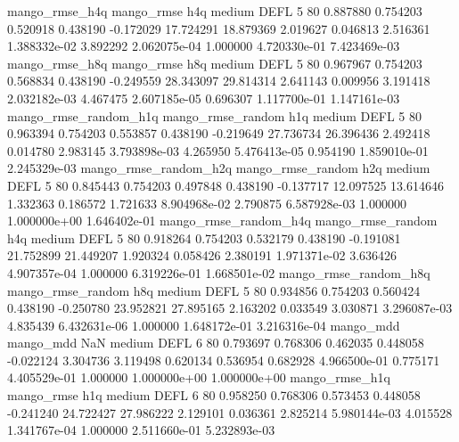        mango_rmse_h4q        mango_rmse                  h4q     medium     DEFL                 5 80  0.887880       0.754203 0.520918       0.438190   -0.172029     17.724291     18.879369     2.019627       0.046813  2.516361 1.388332e-02     3.892292   2.062075e-04            1.000000    4.720330e-01        7.423469e-03
       mango_rmse_h8q        mango_rmse                  h8q     medium     DEFL                 5 80  0.967967       0.754203 0.568834       0.438190   -0.249559     28.343097     29.814314     2.641143       0.009956  3.191418 2.032182e-03     4.467475   2.607185e-05            0.696307    1.117700e-01        1.147161e-03
mango_rmse_random_h1q mango_rmse_random                  h1q     medium     DEFL                 5 80  0.963394       0.754203 0.553857       0.438190   -0.219649     27.736734     26.396436     2.492418       0.014780  2.983145 3.793898e-03     4.265950   5.476413e-05            0.954190    1.859010e-01        2.245329e-03
mango_rmse_random_h2q mango_rmse_random                  h2q     medium     DEFL                 5 80  0.845443       0.754203 0.497848       0.438190   -0.137717     12.097525     13.614646     1.332363       0.186572  1.721633 8.904968e-02     2.790875   6.587928e-03            1.000000    1.000000e+00        1.646402e-01
mango_rmse_random_h4q mango_rmse_random                  h4q     medium     DEFL                 5 80  0.918264       0.754203 0.532179       0.438190   -0.191081     21.752899     21.449207     1.920324       0.058426  2.380191 1.971371e-02     3.636426   4.907357e-04            1.000000    6.319226e-01        1.668501e-02
mango_rmse_random_h8q mango_rmse_random                  h8q     medium     DEFL                 5 80  0.934856       0.754203 0.560424       0.438190   -0.250780     23.952821     27.895165     2.163202       0.033549  3.030871 3.296087e-03     4.835439   6.432631e-06            1.000000    1.648172e-01        3.216316e-04
            mango_mdd         mango_mdd                  NaN     medium     DEFL                 6 80  0.793697       0.768306 0.462035       0.448058   -0.022124      3.304736      3.119498     0.620134       0.536954  0.682928 4.966500e-01     0.775171   4.405529e-01            1.000000    1.000000e+00        1.000000e+00
       mango_rmse_h1q        mango_rmse                  h1q     medium     DEFL                 6 80  0.958250       0.768306 0.573453       0.448058   -0.241240     24.722427     27.986222     2.129101       0.036361  2.825214 5.980144e-03     4.015528   1.341767e-04            1.000000    2.511660e-01        5.232893e-03
